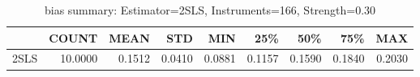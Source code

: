 \begin{table}[ht]
\centering
\caption{bias summary: Estimator=2SLS, Instruments=166, Strength=0.30}
\begin{tabular}{lrrrrrrrr}
\toprule
 & COUNT & MEAN & STD & MIN & 25\% & 50\% & 75\% & MAX \\
\midrule
2SLS & 10.0000 & 0.1512 & 0.0410 & 0.0881 & 0.1157 & 0.1590 & 0.1840 & 0.2030 \\
\bottomrule
\end{tabular}
\end{table}
